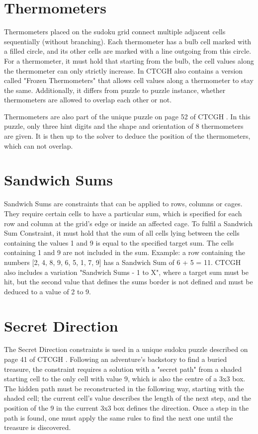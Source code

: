 \section{Thermometers}
Thermometers placed on the sudoku grid connect multiple adjacent cells sequentially (without branching). Each thermometer has a bulb cell marked with a filled circle, and its other cells are marked with a line outgoing from this circle. For a thermometer, it must hold that starting from the bulb, the cell values along the thermometer can only strictly increase. In CTCGH \cite{CrackingTheCryptic2021} also contains a version called "Frozen Thermometers" that allows cell values along a thermometer to stay the same. Additionally, it differs from puzzle to puzzle instance, whether thermometers are allowed to overlap each other or not.

Thermometers are also part of the unique puzzle on page 52 of CTCGH \cite{CrackingTheCryptic2021}. In this puzzle, only three hint digits and the shape and orientation of 8 thermometers are given. It is then up to the solver to deduce the position of the thermometers, which can not overlap.

\section{Sandwich Sums}
Sandwich Sums are constraints that can be applied to rows, columns or cages. They require certain cells to have a particular sum, which is specified for each row and column at the grid's edge or inside an affected cage. To fulfil a Sandwich Sum Constraint, it must hold that the sum of all cells lying between the cells containing the values 1 and 9 is equal to the specified target sum. The cells containing 1 and 9 are not included in the sum. Example: a row containing the numbers [2, 4, 8, 9, 6, 5, 1, 7, 9] has a Sandwich Sum of 6 + 5 = 11. CTCGH \cite{CrackingTheCryptic2021} also includes a variation "Sandwich Sums - 1 to X", where a target sum must be hit, but the second value that defines the sums border is not defined and must be deduced to a value of 2 to 9.

\section{Secret Direction}
The Secret Direction constraints is used in a unique sudoku puzzle described on page 41 of CTCGH \cite{CrackingTheCryptic2021}. Following an adventure's backstory to find a buried treasure, the constraint requires a solution with a "secret path" from a shaded starting cell to the only cell with value 9, which is also the centre of a 3x3 box. The hidden path must be reconstructed in the following way, starting with the shaded cell; the current cell's value describes the length of the next step, and the position of the 9 in the current 3x3 box defines the direction. Once a step in the path is found, one must apply the same rules to find the next one until the treasure is discovered.

